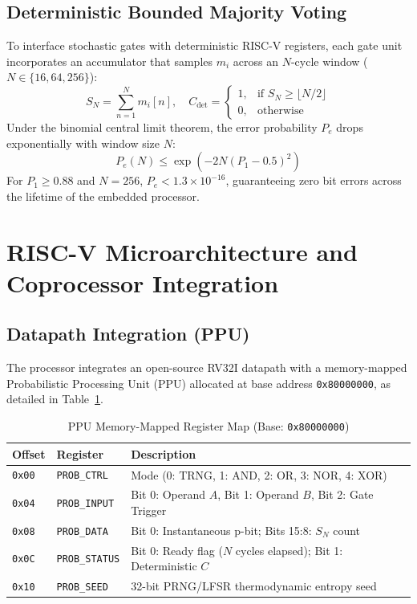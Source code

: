 \documentclass[journal,10pt,twocolumn]{IEEEtran}
\begin{document}
\subsection{Deterministic Bounded Majority Voting}
To interface stochastic gates with deterministic RISC-V registers, each gate unit incorporates an accumulator that samples $m_i$ across an $N$-cycle window ($N \in \{16, 64, 256\}$):
\begin{equation}
S_N = \sum_{n=1}^{N} m_i[n], \quad C_{\text{det}} = \begin{cases} 1, & \text{if } S_N \ge \lfloor N/2 \rfloor \\ 0, & \text{otherwise} \end{cases}
\end{equation}
Under the binomial central limit theorem, the error probability $P_e$ drops exponentially with window size $N$:
\begin{equation}
P_e(N) \le \exp\left( -2 N \left( P_1 - 0.5 \right)^2 \right)
\end{equation}
For $P_1 \ge 0.88$ and $N = 256$, $P_e < 1.3 \times 10^{-16}$, guaranteeing zero bit errors across the lifetime of the embedded processor.

\section{RISC-V Microarchitecture and Coprocessor Integration}

\subsection{Datapath Integration (PPU)}
The processor integrates an open-source RV32I datapath with a memory-mapped Probabilistic Processing Unit (PPU) allocated at base address \texttt{0x80000000}, as detailed in Table~\ref{tab:mmio}.

\begin{table}[h]
\centering
\caption{PPU Memory-Mapped Register Map (Base: \texttt{0x80000000})}
\label{tab:mmio}
\begin{tabular}{lll}
\toprule
\textbf{Offset} & \textbf{Register} & \textbf{Description} \\
\midrule
\texttt{0x00} & \texttt{PROB\_CTRL}   & Mode (0: TRNG, 1: AND, 2: OR, 3: NOR, 4: XOR) \\
\texttt{0x04} & \texttt{PROB\_INPUT}  & Bit 0: Operand $A$, Bit 1: Operand $B$, Bit 2: Gate Trigger \\
\texttt{0x08} & \texttt{PROB\_DATA}   & Bit 0: Instantaneous p-bit; Bits 15:8: $S_N$ count \\
\texttt{0x0C} & \texttt{PROB\_STATUS} & Bit 0: Ready flag ($N$ cycles elapsed); Bit 1: Deterministic $C$ \\
\texttt{0x10} & \texttt{PROB\_SEED}   & 32-bit PRNG/LFSR thermodynamic entropy seed \\
\bottomrule
\end{tabular}
\end{table}
\end{document}
